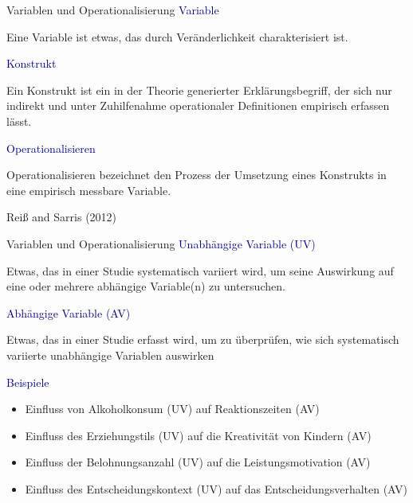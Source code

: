 \documentclass[
  8pt,
  ignorenonframetext,
]{beamer}
\providecommand{\tightlist}{%
  \setlength{\itemsep}{0pt}\setlength{\parskip}{0pt}}
\begin{document}
\begin{frame}{Variablen und Operationalisierung}
\protect\hypertarget{variablen-und-operationalisierung}{}
\textcolor{darkblue}{Variable}

Eine Variable ist etwas, das durch Veränderlichkeit charakterisiert ist.
\vspace{5mm}

\textcolor{darkblue}{Konstrukt}

Ein Konstrukt ist ein in der Theorie generierter Erklärungsbegriff, der
sich nur indirekt und unter Zuhilfenahme operationaler Definitionen
empirisch erfassen lässt. \vspace{5mm}

\textcolor{darkblue}{Operationalisieren}

Operationalisieren bezeichnet den Prozess der Umsetzung eines Konstrukts
in eine empirisch messbare Variable.

\vspace{5mm}
\footnotesize
\flushright

Reiß and Sarris (2012)
\end{frame}

\begin{frame}{Variablen und Operationalisierung}
\protect\hypertarget{variablen-und-operationalisierung-1}{}
\textcolor{darkblue}{Unabhängige Variable (UV)}

Etwas, das in einer Studie systematisch variiert wird, um seine
Auswirkung auf eine oder mehrere abhängige Variable(n) zu untersuchen.
\vspace{3mm}

\textcolor{darkblue}{Abhängige Variable (AV)}

Etwas, das in einer Studie erfasst wird, um zu überprüfen, wie sich
systematisch variierte unabhängige Variablen auswirken \vspace{3mm}

\textcolor{darkblue}{Beispiele}

\small

\begin{itemize}
\tightlist
\item
  Einfluss von Alkoholkonsum (UV) auf Reaktionszeiten (AV)
\item
  Einfluss des Erziehungstils (UV) auf die Kreativität von Kindern (AV)
\item
  Einfluss der Belohnungsanzahl (UV) auf die Leistungsmotivation (AV)
\item
  Einfluss des Entscheidungskontext (UV) auf das Entscheidungsverhalten
  (AV)
\end{itemize}
\end{frame}
\end{document}
